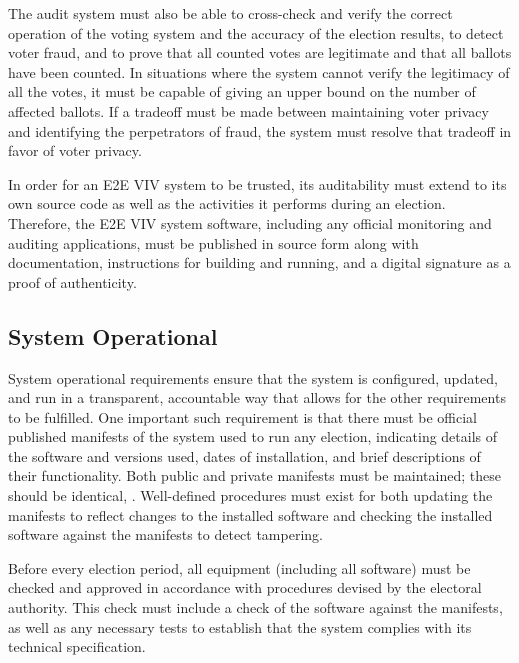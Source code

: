 The audit system must also be able to cross-check and verify the
correct operation of the voting system and the accuracy of the
election results, to detect voter fraud, and to prove that all counted
votes are legitimate and that all ballots have been counted. In
situations where the system cannot verify the legitimacy of all the
votes, it must be capable of giving an upper bound on the number of
affected ballots. If a tradeoff must be made between maintaining voter
privacy and identifying the perpetrators of fraud, the system must
resolve that tradeoff in favor of voter privacy.

In order for an E2E VIV system to be trusted, its auditability must
extend to its own source code as well as the activities it performs
during an election. Therefore, the E2E VIV system software, including
any official monitoring and auditing applications, must be published
in source form along with documentation, instructions for building and
running, and a digital signature as a proof of authenticity.

\subsection{System Operational}

System operational requirements ensure that the system is configured,
updated, and run in a transparent, accountable way that allows for the
other requirements to be fulfilled. One important such requirement is
that there must be official published manifests of the system used to
run any election, indicating details of the software and versions
used, dates of installation, and brief descriptions of their
functionality. Both public and private manifests must be maintained;
these should be identical, . Well-defined procedures must
exist for both updating the manifests to reflect changes to the
installed software and checking the installed software against the
manifests to detect tampering.

Before every election period, all equipment (including all software)
must be checked and approved in accordance with procedures devised by
the electoral authority. This check must include a check of the
software against the manifests, as well as any necessary tests to
establish that the system complies with its technical specification.

